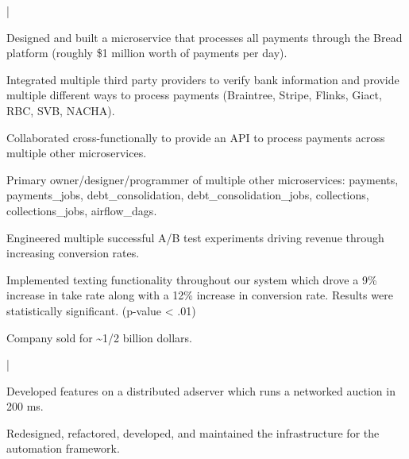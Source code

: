 \documentclass[letterpaper]{deedy-resume}
\begin{document}
\begin{minipage}[t]{0.68\textwidth}
 |
\vspace{\topsep}
\begin{tightitemize}
\item Designed and built a microservice that processes all payments through the Bread platform (roughly \$1 million worth of payments per day). \\
\item Integrated multiple third party providers to verify bank information and provide multiple different ways to process payments (Braintree, Stripe, Flinks, Giact, RBC, SVB, NACHA). \\
\item Collaborated cross-functionally to provide an API to process payments across multiple other microservices. \\
\item Primary owner/designer/programmer of multiple other microservices: payments, payments\_jobs, debt\_consolidation, debt\_consolidation\_jobs, collections, collections\_jobs, airflow\_dags. \\
\item Engineered multiple successful A/B test experiments driving revenue through increasing conversion rates. \\
\item Implemented texting functionality throughout our system which drove a 9\% increase in take rate along with a 12\% increase in conversion rate. Results were statistically significant. (p-value < .01) \\
\item Company sold for \textasciitilde{}1/2 billion dollars. \\

\end{tightitemize}
\sectionspace 

 |
\begin{tightitemize}
\item Developed features on a distributed adserver which runs a networked auction in 200 ms. \\
\item Redesigned, refactored, developed, and maintained the infrastructure for the automation framework. \\


\end{tightitemize}
\sectionspace 


\end{minipage}
\end{document}

